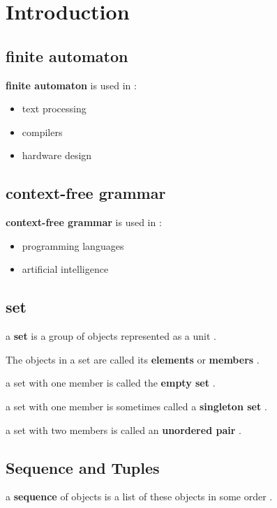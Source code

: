 \documentclass[12pt]{article}
\begin{document}
\section{Introduction}

\subsection{finite automaton}

\textbf{finite automaton} is used in :

\begin{itemize}
	\item text processing
	\item compilers
	\item hardware design
\end{itemize}

\subsection{context-free grammar}

\textbf{context-free grammar} is used in :

\begin{itemize}
	\item programming languages
	\item artificial intelligence
\end{itemize}


\subsection{set}

a \textbf{set} is a group of objects represented as a unit .

\noindent
The objects in a set are called its \textbf{elements} or \textbf{members} .

\noindent
a set with one member is called the \textbf{empty set} .

\noindent
a set with one member is sometimes called a \textbf{singleton set} .

\noindent
a set with two members is called an \textbf{unordered pair} .



\subsection{Sequence and Tuples}

a \textbf{sequence} of objects is a list of these objects in some order .
\end{document}
